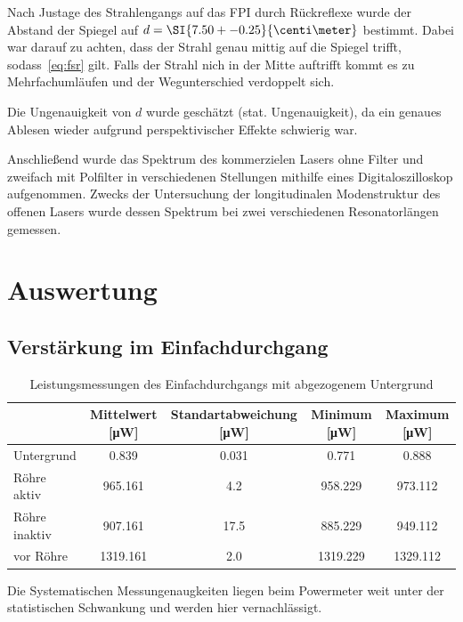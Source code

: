 \documentclass[slug=GL, room=HZDR\ Dresden/Rossendorf\,\ Geb.\ 620/123, supervisor=Tim\ Ziegler]{../../Lab_Report_LaTeX/lab_report}
\begin{document}
Nach Justage des Strahlengangs auf das FPI durch R\"uckreflexe wurde
der Abstand der Spiegel auf \(d=\SI{7.50+-0.25}{\centi\meter}\)
bestimmt. Dabei war darauf zu achten, dass der Strahl genau mittig auf
die Spiegel trifft, sodass~\ref{eq:fsr} gilt. Falls der Strahl nich in
der Mitte auftrifft kommt es zu Mehrfachuml\"aufen und der
Wegunterschied verdoppelt sich.

Die Ungenauigkeit von \(d\) wurde gesch\"atzt (stat. Ungenauigkeit),
da ein genaues Ablesen wieder aufgrund perspektivischer Effekte
schwierig war.

Anschlie\ss{}end wurde das Spektrum des kommerzielen Lasers ohne
Filter und zweifach mit Polfilter in verschiedenen Stellungen mithilfe
eines Digitaloszilloskop aufgenommen. Zwecks der Untersuchung der
longitudinalen Modenstruktur des offenen Lasers wurde dessen Spektrum
bei zwei verschiedenen Resonatorl\"angen gemessen.

\section{Auswertung}
\label{sec:auswertung}

\subsection{Verst\"arkung im Einfachdurchgang}
\label{sec:ausweinf}

\begin{table}[h]
  \begin{tabular}{l|SSSS}
    \toprule
    & {Mittelwert [\si{\micro\watt}]} & {Standartabweichung
                                      [\si{\micro\watt}]} & {Minimum
                                                            [\si{\micro\watt}]}
    & {Maximum [\si{\micro\watt}]} \\
    \midrule
    Untergrund & 0.839 & 0.031 & 0.771 & 0.888 \\
    R\"ohre aktiv & 965.161  & 4.2  & 958.229  & 973.112  \\
    R\"ohre inaktiv & 907.161  & 17.5 & 885.229  & 949.112  \\
    vor R\"ohre & 1319.161 & 2.0  & 1319.229 & 1329.112 \\
    \bottomrule
  \end{tabular}
  \caption{Leistungsmessungen des Einfachdurchgangs mit abgezogenem Untergrund}
  \label{tab:leistungeinfach}
\end{table}

Die Systematischen Messungenaugkeiten liegen beim Powermeter weit
unter der statistischen Schwankung und werden hier vernachl\"assigt.
\end{document}

